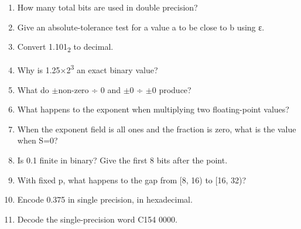 \documentclass[11pt]{article}
\begin{document}
\begin{keepsection}
\begin{enumerate}
\item How many total bits are used in double precision?
\item Give an absolute-tolerance test for a value a to be close to b using ε.
\item Convert 1.101\textsubscript{2} to decimal.
\item Why is 1.25\ensuremath{\times}2\textsuperscript{3} an exact binary value?
\item What do \ensuremath{\pm}non-zero ÷ 0 and \ensuremath{\pm}0 ÷ \ensuremath{\pm}0 produce?
\item What happens to the exponent when multiplying two floating-point values?
\item When the exponent field is all ones and the fraction is zero, what is the value when S=0?
\item Is 0.1 finite in binary? Give the first 8 bits after the point.
\item With fixed p, what happens to the gap from [8, 16) to [16, 32)?
\item Encode 0.375 in single precision, in hexadecimal.
\item Decode the single-precision word C154 0000.
\end{enumerate}

\end{keepsection}
\end{document}
